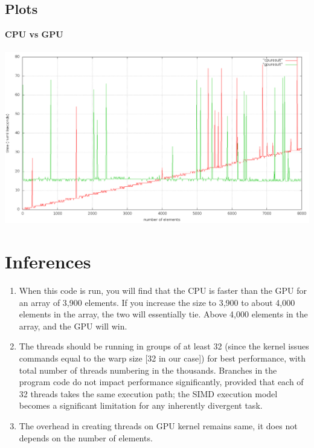 \subsection{Plots}
\vspace{1cm}
\textbf{CPU vs GPU}\\\\
\includegraphics [width=1.2\textwidth]{plot1.png}

\section{Inferences}
\begin{enumerate}
\item When this code is run, you will find that the CPU is faster than the GPU for an array of 3,900 elements. If you increase the size to 3,900 to about 4,000 elements in the array, the two will essentially tie. Above 4,000 elements in the array, and the GPU will win. 
\item The threads should be running in groups of at least 32 (since the kernel issues commands equal to the warp size [32 in our case]) for best performance, with total number of threads numbering in the thousands. Branches in the program code do not impact performance significantly, provided that each of 32 threads takes the same execution path; the SIMD execution model becomes a significant limitation for any inherently divergent task.
\item The overhead in creating threads on GPU kernel remains same, it does not depends on the number of elements. 
\end{enumerate}

